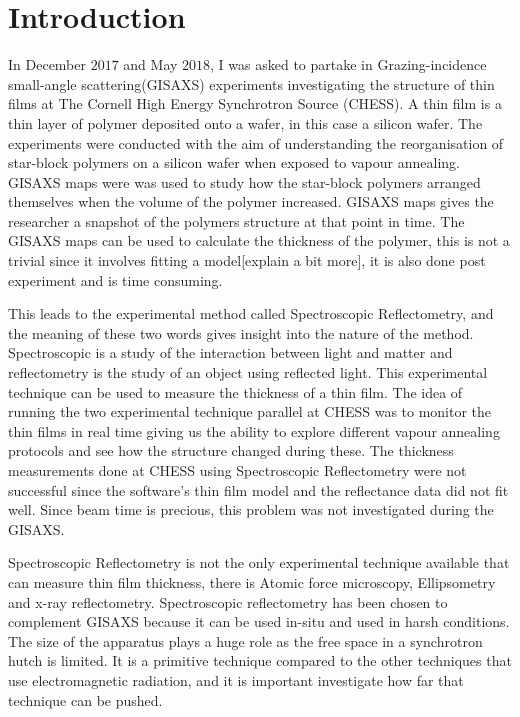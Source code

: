 \documentclass[MasterThesisMain.tex]{subfiles}
\begin{document}
	\chapter{Introduction}
	
In December $2017$ and May $2018$, I was asked to partake in Grazing-incidence small-angle scattering(GISAXS) experiments investigating the structure of thin films at The Cornell High Energy Synchrotron Source (CHESS). A thin film is a thin layer of polymer deposited onto a wafer, in this case a silicon wafer. The experiments were conducted with the aim of understanding the reorganisation of star-block polymers on a silicon wafer when exposed to vapour annealing. GISAXS maps were was used to study how the star-block polymers arranged themselves when the volume of the polymer increased. GISAXS maps gives the researcher a snapshot of the polymers structure at that point in time. The GISAXS maps can be used to calculate the thickness of the polymer, this is not a trivial since it involves fitting a model[explain a bit more], it is also done post experiment and is time consuming. 

This leads to the experimental method called Spectroscopic Reflectometry, and the meaning of these two words gives insight into the nature of the method. Spectroscopic is a study of the interaction between light and matter and reflectometry is the study of an object using reflected light. This experimental technique can be used to measure the thickness of a thin film. The idea of running the two experimental technique parallel at CHESS was to monitor the thin films in real time giving us the ability to explore different vapour annealing protocols and see how the structure changed during these. The thickness measurements done at CHESS using Spectroscopic Reflectometry were not successful since the software's thin film model and the reflectance data did not fit well. Since beam time is precious, this problem was not investigated during the GISAXS.

Spectroscopic Reflectometry is not the only experimental technique available that can measure thin film thickness, there is Atomic force microscopy, Ellipsometry and x-ray reflectometry. Spectroscopic reflectometry has been chosen to complement GISAXS because it can be used in-situ and used in harsh conditions. The size of the apparatus plays a huge role as the free space in a synchrotron hutch is limited. It is a primitive technique compared to the other techniques that use electromagnetic radiation, and it is important investigate how far that technique can be pushed.
\end{document}
